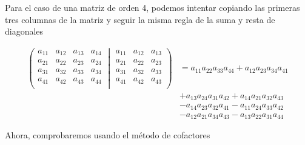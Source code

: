 \documentclass[12pt, letterpaper]{article}
\begin{document}
Para el caso de una matriz de orden 4, podemos intentar copiando las primeras tres columnas de la matriz y seguir la misma regla de la suma y resta de diagonales

\begin{equation*}
    \begin{aligned}
        \left(
        \begin{matrix}
            a_{11} & a_{12} & a_{13} & a_{14} \\
            a_{21} & a_{22} & a_{23} & a_{24} \\
            a_{31} & a_{32} & a_{33} & a_{34} \\
            a_{41} & a_{42} & a_{43} & a_{44} \\
        \end{matrix}
        \middle|
        \begin{matrix}
            a_{11} & a_{12} & a_{13} \\
            a_{21} & a_{22} & a_{23} \\
            a_{31} & a_{32} & a_{33} \\
            a_{41} & a_{42} & a_{43} \\
        \end{matrix} 
        \right)
        & = a_{11}a_{22}a_{33}a_{44} + a_{12}a_{23}a_{34}a_{41} \\
        & + a_{13}a_{24}a_{31}a_{42} + a_{14}a_{21}a_{32}a_{43} \\
        & - a_{14}a_{23}a_{32}a_{41} - a_{11}a_{24}a_{33}a_{42} \\
        & - a_{12}a_{21}a_{34}a_{43} - a_{13}a_{22}a_{31}a_{44}
    \end{aligned}
\end{equation*}

\newpage

Ahora, comprobaremos usando el método de cofactores
\end{document}
